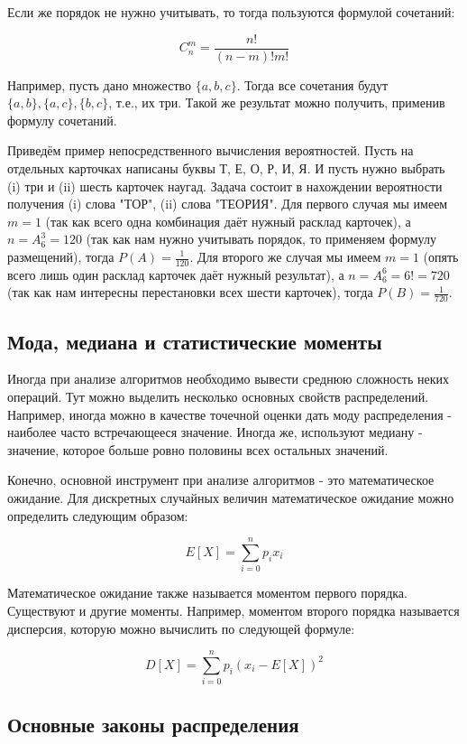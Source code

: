 Если же порядок не нужно учитывать, то тогда пользуются формулой сочетаний:

$$C_n^m=\frac{n!}{(n-m)!m!}$$

Например, пусть дано множество $\{a, b, c\}$. Тогда все сочетания будут 
$\{a, b\}, \{a, c\}, \{b, c\}$, т.е., их три. Такой же результат можно получить,
применив формулу сочетаний.

Приведём пример непосредственного вычисления вероятностей. Пусть на отдельных карточках
написаны буквы Т, Е, О, Р, И, Я. И пусть нужно выбрать (i) три и (ii) шесть карточек наугад. 
Задача состоит в нахождении вероятности получения (i) слова "ТОР", (ii) слова "ТЕОРИЯ".
Для первого случая мы имеем $m=1$ (так как всего одна комбинация даёт нужный 
расклад карточек), а $n=A_6^3=120$ (так как нам нужно учитывать порядок, то 
применяем формулу размещений), тогда $P(A)=\frac{1}{120}$. Для
второго же случая мы имеем $m=1$ (опять всего лишь один расклад карточек
даёт нужный результат), а $n=A_6^6=6!=720$ (так как нам интересны перестановки 
всех шести карточек), тогда $P(B)=\frac{1}{720}$.

\subsection{Мода, медиана и статистические моменты}

Иногда при анализе алгоритмов необходимо вывести среднюю сложность 
неких операций. Тут можно выделить несколько основных свойств распределений.
Например, иногда можно в качестве точечной оценки дать моду распределения - 
наиболее часто встречающееся значение. Иногда же, используют медиану - 
значение, которое больше ровно половины всех остальных значений. 

Конечно, основной инструмент при анализе алгоритмов - это математическое 
ожидание. Для дискретных случайных величин математическое ожидание 
можно определить следующим образом:

$$E[X]=\sum_{i=0}^{n}p_ix_i$$

Математическое ожидание также называется моментом первого порядка. 
Существуют и другие моменты. Например, моментом второго порядка называется
дисперсия, которую можно вычислить по следующей формуле:

$$D[X] = \sum_{i=0}^{n}p_i(x_i-E[X])^2$$

\subsection{Основные законы распределения}

